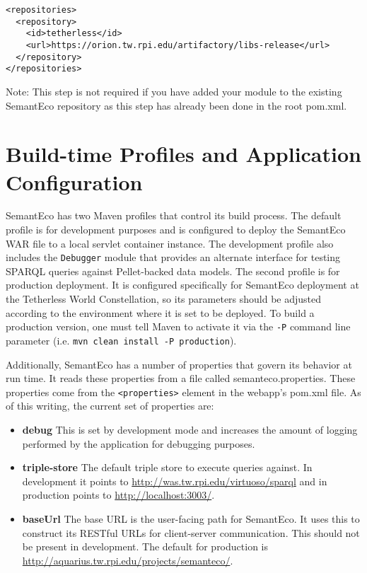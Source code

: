 \documentclass[letterpaper]{report}
\begin{document}
\begin{lstlisting}
<repositories>
  <repository>
    <id>tetherless</id>
    <url>https://orion.tw.rpi.edu/artifactory/libs-release</url>
  </repository>
</repositories>
\end{lstlisting}

\noindent Note: This step is not required if you have added your module to the existing SemantEco repository as this step has already been done in the root pom.xml.

\section{Build-time Profiles and Application Configuration}
SemantEco has two Maven profiles that control its build process. The default profile is for development purposes and is configured to deploy the SemantEco WAR file to a local servlet container instance. The development profile also includes the \texttt{Debugger} module that provides an alternate interface for testing SPARQL queries against Pellet-backed data models. The second profile is for production deployment. It is configured specifically for SemantEco deployment at the Tetherless World Constellation, so its parameters should be adjusted according to the environment where it is set to be deployed. To build a production version, one must tell Maven to activate it via the \texttt{-P} command line parameter (i.e. \texttt{mvn clean install -P production}).

Additionally, SemantEco has a number of properties that govern its behavior at run time. It reads these properties from a file called semanteco.properties. These properties come from the \texttt{<properties>} element in the webapp's pom.xml file. As of this writing, the current set of properties are:

\begin{itemize}
\item \textbf{debug} This is set by development mode and increases the amount of logging performed by the application for debugging purposes.
\item \textbf{triple-store} The default triple store to execute queries against. In development it points to \url{http://was.tw.rpi.edu/virtuoso/sparql} and in production points to \url{http://localhost:3003/}.
\item \textbf{baseUrl} The base URL is the user-facing path for SemantEco. It uses this to construct its RESTful URLs for client-server communication. This should not be present in development. The default for production is \url{http://aquarius.tw.rpi.edu/projects/semanteco/}.
\end{itemize}
\end{document}
